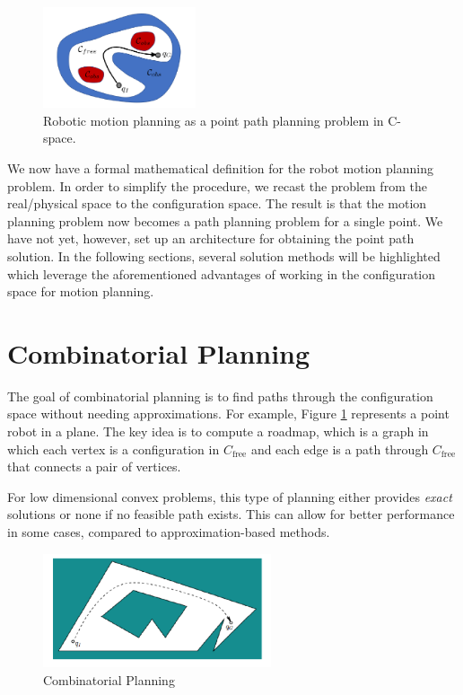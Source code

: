 \documentclass[twoside]{article}
\begin{document}
\begin{figure}[ht!]
\begin{center}
\includegraphics[width=0.4\textwidth]{fig15_3.PNG}
\caption{Robotic motion planning as a point path planning problem in C-space.}
\end{center}
\end{figure}

We now have a formal mathematical definition for the robot motion planning problem. In order to simplify the procedure, we recast the problem from the real/physical space to the configuration space. The result is that the motion planning problem now becomes a path planning problem for a single point. We have not yet, however, set up an architecture for obtaining the point path solution. In the following sections, several solution methods will be highlighted which leverage the aforementioned advantages of working in the configuration space for motion planning.

\section{Combinatorial Planning}
The goal of combinatorial planning is to find paths through the configuration space without needing approximations. For example, Figure \ref{fig:15_4} represents a point robot in a plane. The key idea is to compute a roadmap, which is a graph in which each vertex is a configuration in $C_\text{free}$ and each edge is a path through $C_\text{free}$ that connects a pair of vertices.

For low dimensional convex problems, this type of planning either provides \textit{exact} solutions or none if no feasible path exists. This can allow for better performance in some cases, compared to approximation-based methods.

\begin{figure}[H]
\begin{center}
\includegraphics[width=0.6\textwidth]{fig15_4.PNG}
\caption{Combinatorial Planning}
\label{fig:15_4}
\end{center}
\end{figure}
\end{document}
